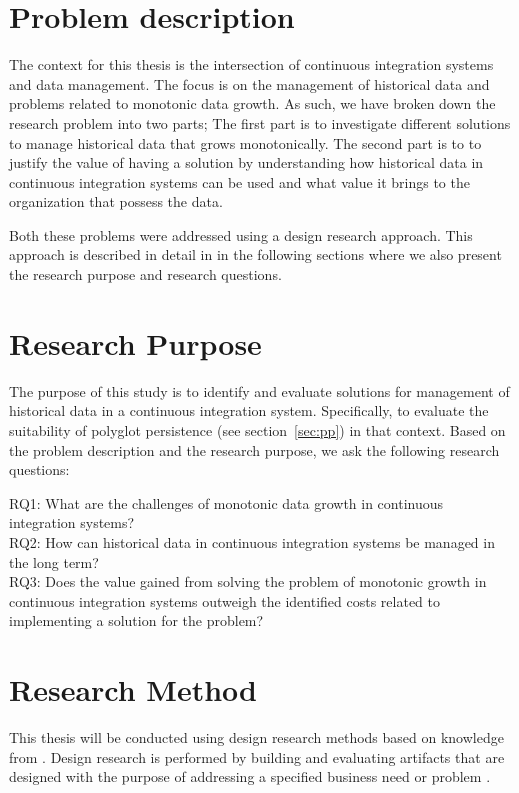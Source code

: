 \section{Problem description}
The context for this thesis is the intersection of continuous integration systems and data management. The focus is on the management of historical data and problems related to monotonic data growth. As such, we have broken down the research problem into two parts; The first part is to investigate different solutions to manage historical data that grows monotonically. The second part is to to justify the value of having a solution by understanding how historical data in continuous integration systems can be used and what value it brings to the organization that possess the data. 

Both these problems were addressed using a design research approach. This approach is described in detail in in the following sections where we also present the research purpose and research questions.

\section{Research Purpose}
The purpose of this study is to identify and evaluate solutions for management of historical data in a continuous integration system. Specifically, to evaluate the suitability of polyglot persistence (see section~\ref{sec:pp}) in that context. Based on the problem description and the research purpose, we ask the following research questions:

RQ1: What are the challenges of monotonic data growth in continuous integration systems? \\
RQ2: How can historical data in continuous integration systems be managed in the long term? \\
RQ3: Does the value gained from solving the problem of monotonic growth in continuous integration systems outweigh the identified costs related to implementing a solution for the problem? \\

\section{Research Method}
This thesis will be conducted using design research methods based on knowledge from \cite{DS, Peffers, DesignEval}. Design research is performed by building and evaluating artifacts that are designed with the purpose of addressing a specified business need or problem \cite{DS}. 

